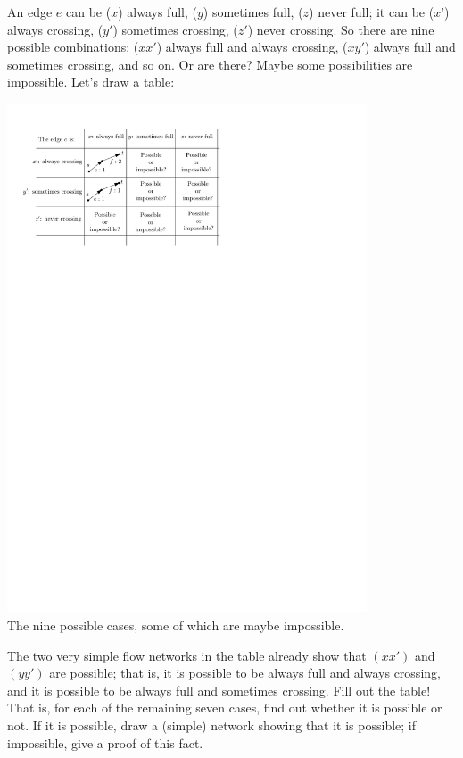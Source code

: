 \documentclass[12pt,a4]{article}
\begin{document}
\begin{exercise}
An edge $e$ can be ($x$) always full, ($y$) sometimes full, ($z$) never full; it can be ($x$') always crossing, ($y'$) sometimes crossing, ($z'$) never crossing. So there are nine possible combinations: ($xx'$) always full and always crossing, ($xy'$) always full and sometimes crossing, and so on. Or are there? Maybe some possibilities are impossible. 
Let's draw a table:
\begin{center}
\includegraphics[width=0.8\textwidth]{figures/always-somtimes-never-table.pdf} \\
\small The nine possible cases, some of which are maybe impossible.
\end{center}
The two very simple flow networks in the table already show that $(xx')$ and $(yy')$ are possible; that is,
it is possible to be always full and always crossing, and it is possible to be always full and sometimes crossing.
Fill out the table! That is, for each of the remaining seven cases, find out whether it is possible or not. If it is
possible, draw a (simple) network showing that it is possible; if impossible, give a proof of this fact.
\end{exercise}
\end{document}
